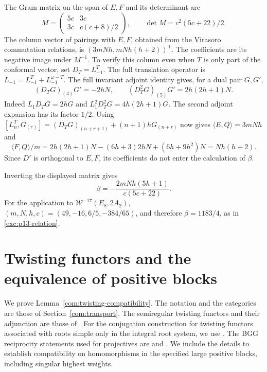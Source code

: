 \documentclass[11pt,a4paper]{amsart}
\numberwithin{equation}{section}
\theoremstyle{definition}
\theoremstyle{remark}
\begin{document}
The Gram matrix on the span of $E,F$ and its determinant are
$$
 M=\begin{pmatrix}5c&3c\\3c&c(c+8)/2\end{pmatrix},\qquad
 \det M=c^2(5c+22)/2.
$$
The column vector of pairings with $E,F$, obtained from the Virasoro commutation
relations, is $(3mNh,mNh(h+2))^{\mathsf T}$. The coefficients
are its negative image under $M^{-1}$. To verify this column even
when $T$ is only part of the conformal vector, set $D_T=L^T_{-1}$.
The full translation operator is
$L_{-1}=L^T_{-1}+L^{\omega-T}_{-1}$. The full invariant adjoint identity gives, for a dual pair $G,G'$,
$$
 (D_TG)_{(4)}G'=-2hN,\qquad
 (D_T^2G)_{(5)}G'=2h(2h+1)N.
$$
Indeed $L_1D_TG=2hG$ and
$L_1^2D_T^2G=4h(2h+1)G$. The second adjoint expansion has its
factor $1/2$. Using
$[L^T_n,G_{(r)}]=(D_TG)_{(n+r+1)}+(n+1)hG_{(n+r)}$
now gives $\langle E,Q\rangle=3mNh$ and
$$
 \langle F,Q\rangle/m
 =2h(2h+1)N-(6h+3)2hN+(6h+9h^2)N=Nh(h+2).
$$
Since $D'$ is orthogonal to $E,F$, its coefficients do not enter
the calculation of $\beta$.

Inverting the displayed matrix gives
$$
               \beta=-\frac{2mNh(5h+1)}{c(5c+22)}.
$$
For the application to $\mathcal W^{-17}(E_8,2A_2)$,
$(m,N,h,c)=(49,-16,6/5,-384/65)$, and therefore
$\beta=1183/4$, as in \eqref{exc:p13-relation}.

\section{Twisting functors and the equivalence of positive blocks}
\label{app:twisting-compatibility}
We prove Lemma~\ref{com:twisting-compatibility}. The notation and the categories
are those of Section~\ref{com:transport}. The semiregular twisting
functors and their adjunction are those of \cite[Sections~4--5]{ABGG}.
For the conjugation construction for twisting functors associated with
roots simple only in the integral root system, we use
\cite[Corollary~5.6 and Lemma~5.8]{ABGG}. The BGG reciprocity statements
used for projectives are \cite[Theorem~2.2]{Fiebig} and
\cite[Theorem~3.4]{Liu2022}. We include the details to establish
compatibility on homomorphisms in the specified large positive blocks,
including singular highest weights.
\end{document}
